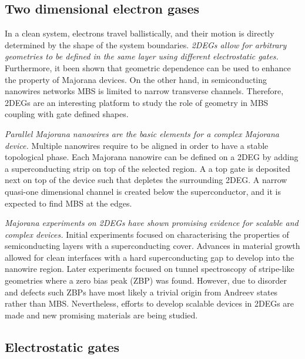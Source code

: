 
\subsection{Two dimensional electron gases}

In a clean system, electrons travel ballistically, and their motion is directly determined by the shape of the system boundaries.
\textit{2DEGs allow for arbitrary geometries to be defined in the same layer using different electrostatic gates.}
Furthermore, it been shown that geometric dependence can be used to enhance the property of Majorana devices.
On the other hand, in semiconducting nanowires networks MBS is limited to narrow transverse channels.
Therefore, 2DEGs are an interesting platform to study the role of geometry in MBS coupling with gate defined shapes.

\textit{Parallel Majorana nanowires are the basic elements for a complex Majorana device.}
Multiple nanowires require to be aligned in order to have a stable topological phase.
Each Majorana nanowire can be defined on a 2DEG by adding a superconducting strip on top of the selected region.
A a top gate is deposited next on top of the device such that depletes the surrounding 2DEG.
A narrow quasi-one dimensional channel is created below the superconductor, and it is expected to find MBS at the edges.

\textit{Majorana experiments on 2DEGs have shown promising evidence for scalable and complex devices.}
Initial experiments\cite{Shabani2015,Kjaergaard2016} focused on characterising the properties of semiconducting layers with a superconducting cover.
Advances in material growth allowed for clean interfaces with a hard superconducting gap to develop into the nanowire region.
Later experiments focused on tunnel spectroscopy of stripe-like geometries\cite{Suominen2017} where a zero bias peak (ZBP) was found.
However, due to disorder and defects such ZBPs have most likely a trivial origin from Andreev states rather than MBS.
Nevertheless, efforts to develop scalable devices in 2DEGs are made and new promising materials are being studied.

\subsection{Electrostatic gates}

